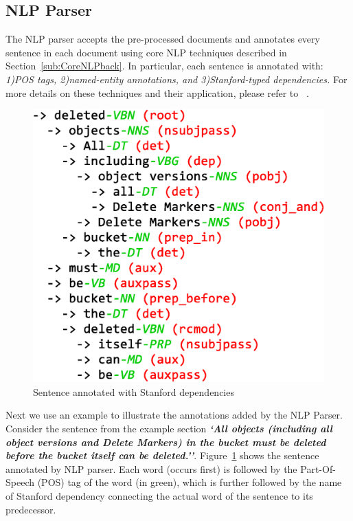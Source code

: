 \subsection{NLP Parser}


The NLP parser accepts the pre-processed documents and annotates every sentence in each document using core NLP techniques described in Section~\ref{sub:CoreNLPback}.
In particular, each sentence is annotated with: \textit{1)POS tags, 2)named-entity annotations, and 3)Stanford-typed dependencies.}
For more details on these techniques and their application, please refer to ~\cite{Marneffe06LREC, Marneffe08COLING, pandita12:inferring, pandita13:WHYPER, thummalapentaICSE12}.

\begin{figure}
	\centering
		\includegraphics[scale=0.3]{StanfordAnnotated.eps}
	\caption{Sentence annotated with Stanford dependencies}
	\label{fig:standep}
\end{figure}

Next we use an example to illustrate the annotations added by the NLP Parser. Consider the sentence from the example section \textbf{\textit{`All objects (including all object versions and Delete Markers) in the bucket must be deleted before the bucket itself can be deleted.''}}. Figure~\ref{fig:standep} shows the sentence annotated by NLP parser. Each word (occurs first) is followed by the Part-Of-Speech (POS) tag of the word (in green), which is further followed by the name of Stanford dependency connecting the actual word of the sentence to its predecessor.

